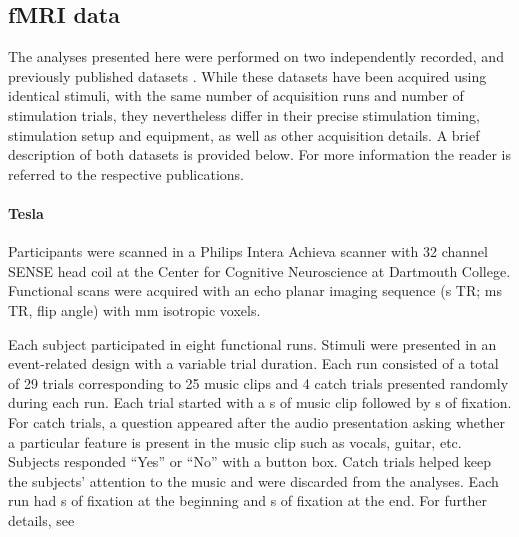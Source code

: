 \subsection*{fMRI data}

The analyses presented here were performed on two independently recorded, and
previously published datasets \citep{CTK+2012,HDH+2015} . While these datasets
have been acquired using identical stimuli, with the same number of acquisition
runs and number of stimulation trials, they nevertheless differ in their
precise stimulation timing, stimulation setup and equipment, as well as other
acquisition details. A brief description of both datasets is provided below.
For more information the reader is referred to the respective publications.

\paragraph{\unit[3]{Tesla}}
%
Participants were scanned in a Philips Intera Achieva scanner with 32 channel
SENSE head coil at the Center for Cognitive Neuroscience at Dartmouth College.
Functional scans were acquired with an echo planar imaging sequence
(\unit[2]{s} TR; \unit[35]{ms} TR, \unit[90]{\textdegree} flip angle) with
\unit[3]{mm} isotropic voxels.

Each subject participated in eight functional runs. Stimuli were presented in
an event-related design with a variable trial duration. Each run consisted of a
total of 29 trials corresponding to 25 music clips and 4 catch trials presented
randomly during each run. Each trial started with a \unit[6]{s} of music clip
followed by \unit[4-8]{s} of fixation. For catch trials, a question appeared
after the audio presentation asking whether a particular feature is present in
the music clip such as vocals, guitar, etc. Subjects responded “Yes” or “No”
with a button box. Catch trials helped keep the subjects’ attention to the
music and were discarded from the analyses. Each run had \unit[4]{s} of
fixation at the beginning and \unit[10]{s} of fixation at the end. For further
details, see \citet{CTK+2012}

